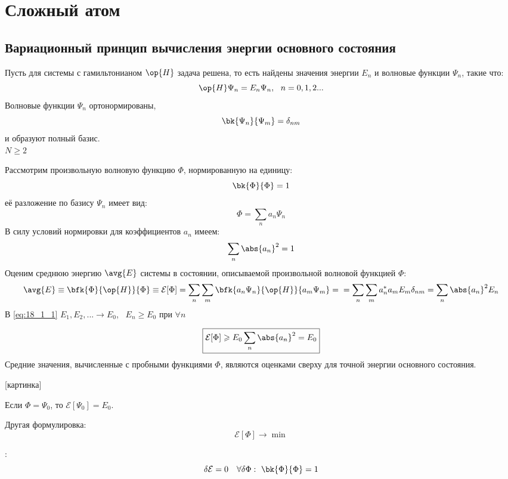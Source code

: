\chapter{Сложный атом}

\section{Вариационный принцип вычисления энергии основного состояния}

Пусть для системы с гамильтонианом $\op{H}$ задача решена, то есть найдены значения энергии $E_n$ и волновые функции $\Psi_n$, такие что:
$$
\op{H}\Psi_n = E_n \Psi_n,~~ n = 0,1,2...
$$
Волновые функции $\Psi_n$ ортонормированы,
$$
\bk{\Psi_n}{\Psi_m} = \delta_{nm}
$$
и образуют полный базис.\\
$N \geqslant 2$

Рассмотрим произвольную волновую функцию $\Phi$, нормированную на единицу:
$$
\bk{\Phi}{\Phi} = 1
$$
её разложение по базису $\Psi_n$ имеет вид:
$$
\Phi = \sum_n a_n \Psi_n
$$
В силу условий нормировки для коэффициентов $a_n$ имеем:
$$
\sum_n \abs{a_n}^2 = 1
$$
Оценим среднюю энергию $\avg{E}$ системы в состоянии, описываемой произвольной волновой функцией $\Phi$:
\begin{equation}
\label{eq:18_1_1}
\avg{E} \equiv \bfk{\Phi}{\op{H}}{\Phi} \equiv \mathcal{E}[\Phi] = \sum_n \sum_m \bfk{a_n \Psi_n}{\op{H}}{a_m \Psi_m} = \\ = \sum_n \sum_m a_n^* a_m E_m \delta_{nm} = \sum_n \abs{a_n}^2 E_n
\end{equation}
В \eqref{eq:18_1_1} $E_1, E_2, ... \to E_0$,~ $E_n \geqslant E_0$ при $\forall n$

\begin{equation}
\label{eq:18_1_2}
\boxed{\mathcal{E}[\Phi] \geqslant E_0 \sum_n \abs{a_n}^2 = E_0}
\end{equation}
Средние значения, вычисленные с пробными функциями $\Phi$, являются оценками сверху для точной энергии основного состояния.

[картинка]

Если $\Phi = \Psi_0$, то $\mathcal{E}[\Psi_0] = E_0$. 

Другая формулировка:
\begin{equation}
\label{eq:18_1_3}
\mathcal{E}[\Phi] \to \min
\end{equation}

:
\begin{equation}
\label{eq:18_1_4}
\delta \mathcal{E} = 0 ~~~ \forall \delta\Phi:~ \bk{\Phi}{\Phi} = 1
\end{equation}

